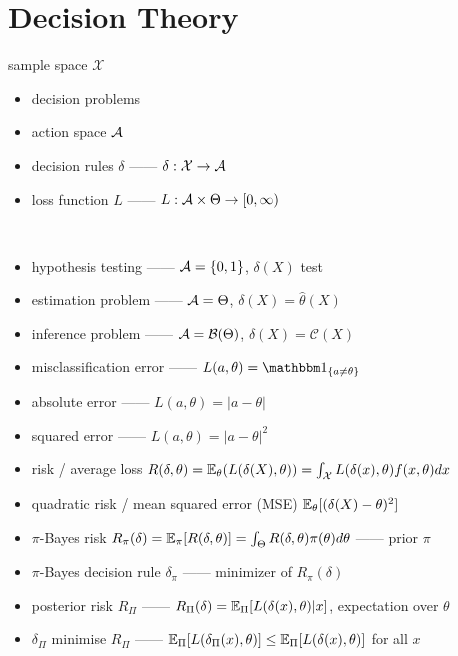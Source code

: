 \section{Decision Theory}\label{sec:decision-theory}

\begin{setting}
    sample space $\mathcal{X}$
\end{setting}

\begin{itemize}
    \item decision problems
    \item action space $\mathcal{A}$
    \item decision rules $\delta$ ------ $\delta:\mathcal{X} \rightarrow \mathcal{A}$
    \item loss function $L$ ------ $L:\mathcal{A} \times \Theta \rightarrow [0, \infty)$
\end{itemize}

\begin{example}\,
    \begin{itemize}
        \item hypothesis testing ------ $\mathcal{A} = \left\{ 0, 1 \right\}$, $\delta(X)$ test
        \item estimation problem ------ $\mathcal{A} = \Theta$, $\delta(X) = \hat \theta(X)$
        \item inference problem ------ $\mathcal{A} = \mathcal{B}(\Theta)$, $\delta(X) = \mathcal{C}(X)$
    \end{itemize}
\end{example}


\begin{itemize}
    \item misclassification error ------ $L(a, \theta) = \In_{\left\{ a \neq \theta \right\}}$
    \item absolute error ------ $L(a, \theta) = |a - \theta|$
    \item squared error ------ $L(a, \theta) = |a - \theta|^2$
    \item risk / average loss $R(\delta, \theta) = \mathbb{E}_\theta(L(\delta(X), \theta)) = \int_\mathcal{X} L(\delta(x), \theta)f(x, \theta)dx$
    \item quadratic risk / mean squared error (MSE) $\mathbb{E}_\theta[(\delta(X) - \theta)^2]$
    \item $\pi$-Bayes risk $R_\pi(\delta) = \mathbb{E}_\pi[R(\delta, \theta)] = \int_\Theta R(\delta, \theta)\pi(\theta) d\theta$ ------ prior $\pi$
    \item $\pi$-Bayes decision rule $\delta_{\pi}$ ------ minimizer of $R_\pi(\delta)$
    \item posterior risk $R_\Pi$ ------ $R_\Pi(\delta) = \mathbb{E}_\Pi[L(\delta(x), \theta)|x]$, expectation over $\theta$
    \item $\delta_{\Pi}$ minimise $R_\Pi$ ------ $\mathbb{E}_\Pi[L(\delta_\Pi(x), \theta)] \leq \mathbb{E}_{\Pi}[L(\delta(x), \theta)]$ for all $x$
\end{itemize}

